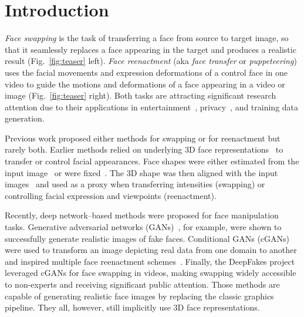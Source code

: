 \section{Introduction}

{\em Face swapping} is the task of transferring a face from source to target image, so that it seamlessly replaces a face appearing in the target and produces a realistic result (Fig.~\ref{fig:teaser} left). {\em Face reenactment} (aka {\em face transfer} or {\em puppeteering}) uses the facial movements and expression deformations of a control face in one video to guide the motions and deformations of a face appearing in a video or image (Fig.~\ref{fig:teaser} right). Both tasks are attracting significant research attention due to their applications in entertainment~\cite{alexander2009creating,kemelmacher2016transfiguring,wolf2010eye}, privacy~\cite{blanz2004exchanging,lin2012face,mosaddegh2014photorealistic}, and training data generation. 

Previous work proposed either methods for swapping or for reenactment but rarely both. Earlier methods relied on underlying 3D face representations~\cite{tran2017extreme} to transfer or control facial appearances. Face shapes were either estimated from the input image~\cite{thies2016face2face,suwajanakorn2017synthesizing,nirkin2018face} or were fixed~\cite{nirkin2018face}. The 3D shape was then aligned with the input images~\cite{chang17fpn} and used as a proxy when transferring intensities (swapping) or controlling facial expression and viewpoints (reenactment). %

Recently, deep network--based methods were proposed for face manipulation tasks. Generative adversarial networks (GANs)~\cite{goodfellow2014generative}, for example, were shown to successfully generate realistic images of fake faces. Conditional GANs (cGANs)~\cite{mirza2014conditional,isola2017image,wang2018pix2pixHD} were used to transform an image depicting real data from one domain to another and inspired multiple face reenactment schemes~\cite{pumarola2018ganimation,wayne2018reenactgan,sanchez2018triple}. Finally, the DeepFakes project~\cite{DeepFakes} leveraged cGANs for face swapping in videos, making swapping widely accessible to non-experts and receiving significant public attention. Those methods are capable of generating realistic face images by replacing the classic graphics pipeline. They all, however, still implicitly use 3D face representations.

